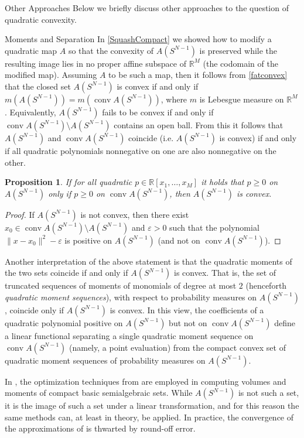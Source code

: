 \documentclass[12pt,oneside,final]{ucthesisucsbmath2010}
\newcommand{\R}{\mathbb{R}}
\DeclareMathOperator{\conv}{conv}
\newtheorem{prop}[thm]{Proposition}
\theoremstyle{definition}
\begin{document}
\begin{chapter}{Other Approaches}
Below we briefly discuss other approaches to the question of quadratic convexity.
\begin{section}{Moments and Separation}
In \ref{SquashCompact} we showed how to modify a quadratic map $A$ so that the convexity of $A(S^{N-1})$ is preserved while the resulting image lies in no proper affine subspace of $\R^M$ (the codomain of the modified map). Assuming $A$ to be such a map, then it follows from \ref{fatconvex} that the closed set $A(S^{N-1})$ is convex if and only if $m(A(S^{N-1})) = m(\conv A(S^{N-1}))$, where $m$ is Lebesgue measure on $\R^M$. Equivalently, $A(S^{N-1})$ fails to be convex if and only if $\conv A(S^{N-1})\setminus A(S^{N-1})$ contains an open ball. From this it follows that $A(S^{N-1})$ and $\conv A(S^{N-1})$ coincide (i.e. $A(S^{N-1})$ is convex) if and only if all quadratic polynomials nonnegative on one are also nonnegative on the other.

\begin{prop}If for all quadratic $p \in \R[x_1,\ldots,x_M]$ it holds that $p\geq 0$ on $A(S^{N-1})$ only if $p \geq 0$ on $\conv A(S^{N-1})$, then $A(S^{N-1})$ is convex.
\end{prop}
\begin{proof}If $A(S^{N-1})$ is not convex, then there exist $x_0 \in \conv A(S^{N-1}) \setminus A(S^{N-1})$ and $\varepsilon >0$ such that the polynomial $\|x-x_0\|^2-\varepsilon$ is positive on $A(S^{N-1})$ (and not on $\conv A(S^{N-1})$).
\end{proof}
Another interpretation of the above statement is that the quadratic moments of the two sets coincide if and only if $A(S^{N-1})$ is convex. That is, the set of truncated sequences of moments of monomials of degree at most $2$ (henceforth \emph{quadratic moment sequences}), with respect to probability measures on $A(S^{N-1})$, coincide only if $A(S^{N-1})$ is convex. In this view, the coefficients of a quadratic polynomial positive on $A(S^{N-1})$ but not on $\conv A(S^{N-1})$ define a linear functional separating a single quadratic moment sequence on $\conv A(S^{N-1})$ (namely, a point evaluation) from the compact convex set of quadratic moment sequences of probability measures on $A(S^{N-1})$. 

In \cite{LassHen}, the optimization techniques from \cite{LassOG} are employed in computing volumes and moments of compact basic semialgebraic sets. While $A(S^{N-1})$ is not such a set, it is the image of such a set under a linear transformation, and for this reason the same methods can, at least in theory, be applied. In practice, the convergence of the approximations of \cite{LassHen} is thwarted by round-off error.
\end{section}


\end{chapter}
\end{document}
